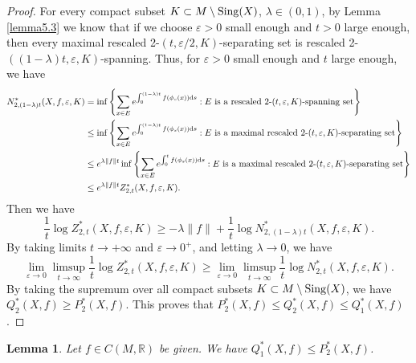 \documentclass[10pt]{article}
\newtheorem*{Theorem A}{Theorem A}
\newtheorem{Lemma}[Theorem]{Lemma}
\begin{document}
\begin{proof}
For every compact subset $K\subset M\setminus{\rm Sing}(X)$, $\lambda\in(0,1)$, by Lemma \ref{lemma5.3} we know that if we choose $\varepsilon>0$  small enough and $t>0$ large enough, then every maximal rescaled 2-$(t,\varepsilon/2, K)$-separating set is rescaled 2-$((1-\lambda)t, \varepsilon, K)$-spanning. Thus, for $\varepsilon>0$ small enough and $t$ large enough, we have
\[
\begin{aligned}
N_{2, (1-\lambda)t}^*(X, f, \varepsilon, K) & =\inf\left\{\sum_{x \in E} e^{\int_0^{(1-\lambda)t} f(\phi_s (x)) {\rm d}s} : E \text{ is a rescaled 2-} (t,\varepsilon,K)\text{-spanning set} \right\}\\
& \leq\inf\left\{\sum_{x \in E} e^{\int_0^{(1-\lambda)t} f(\phi_s (x)) {\rm d}s} : E \text{ is a maximal rescaled  2-} (t,\varepsilon,K)\text{-separating set} \right\}\\
&\leq e ^{\lambda \|f\| t}\inf\left\{\sum_{x \in E} e^{\int_0^{t} f(\phi_s (x)) {\rm d}s} : E \text{ is a maximal rescaled  2-} (t,\varepsilon,K)\text{-separating set} \right\}\\
&\leq e^{\lambda \|f\|t}Z_{2, t}^*(X, f, \varepsilon, K).
\end{aligned}
\]
Then we have
\[
\frac{1}{t} \log Z_{2,t}^*(X, f, \varepsilon, K) \geq -\lambda \|f\| + \frac{1}{t} \log N_{2,(1-\lambda)t}^*(X, f, \varepsilon, K).
\]
By taking limits $t\to+\infty$ and $\varepsilon\to 0^+$, and letting $\lambda \to 0$, we have
\[
\lim_{\varepsilon \to 0} \limsup_{t \to \infty} \frac{1}{t} \log Z_{2,t}^*(X, f, \varepsilon, K) \geq \lim_{\varepsilon \to 0} \limsup_{t \to \infty} \frac{1}{t} \log N_{2,t}^*(X, f, \varepsilon, K).
\]
By taking the supremum over all compact subsets $K\subset M\setminus{\rm Sing}(X)$, we have $Q_2^*(X, f)\geq P_2^*(X, f)$. This proves that $P_2^*(X, f)\leq Q_2^*(X, f)\leq Q_1^*(X, f)$.
\end{proof}

\begin{Lemma}\label{lemma5.5}
Let $f\in C(M, \mathbb{R})$ be given. We have $Q_1^*(X,f)\leq P_2^*(X, f)$.
\end{Lemma}
\end{document}
